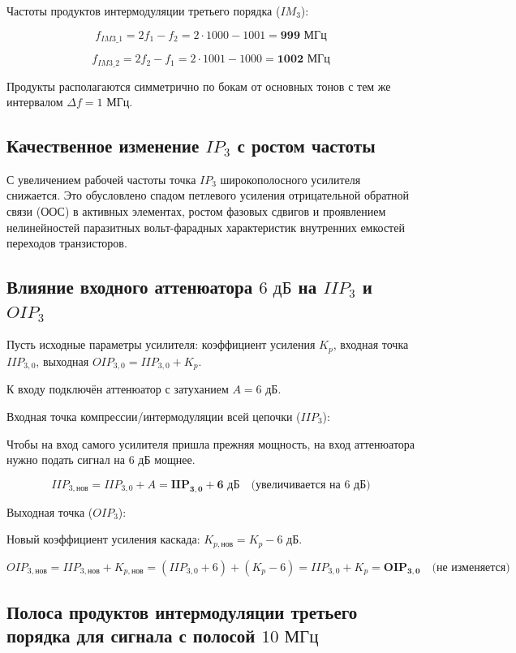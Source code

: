 Частоты продуктов интермодуляции третьего порядка ($IM_3$):

$$f_{IM3\_1} = 2f_1 - f_2 = 2 \cdot 1000 - 1001 = \mathbf{999\text{ МГц}}$$

$$f_{IM3\_2} = 2f_2 - f_1 = 2 \cdot 1001 - 1000 = \mathbf{1002\text{ МГц}}$$

Продукты располагаются симметрично по бокам от основных тонов с тем же интервалом $\Delta f = 1\text{ МГц}$.

\subsection* {Качественное изменение $IP_3$ с ростом частоты}

С увеличением рабочей частоты точка $IP_3$ широкополосного усилителя снижается. Это обусловлено спадом петлевого усиления отрицательной обратной связи (ООС) в активных элементах, ростом фазовых сдвигов и проявлением нелинейностей паразитных вольт-фарадных характеристик внутренних емкостей переходов транзисторов.

\subsection* {Влияние входного аттенюатора $6\text{ дБ}$ на $IIP_3$ и $OIP_3$}

Пусть исходные параметры усилителя: коэффициент усиления $K_p$, входная точка $IIP_{3,0}$, выходная $OIP_{3,0} = IIP_{3,0} + K_p$.

К входу подключён аттенюатор с затуханием $A = 6\text{ дБ}$.

Входная точка компрессии/интермодуляции всей цепочки ($IIP_3$):

Чтобы на вход самого усилителя пришла прежняя мощность, на вход аттенюатора нужно подать сигнал на $6\text{ дБ}$ мощнее.

$$IIP_{3,\text{нов}} = IIP_{3,0} + A = \mathbf{IIP_{3,0} + 6\text{ дБ}}\quad \text{(увеличивается на 6 дБ)}$$

Выходная точка ($OIP_3$):

Новый коэффициент усиления каскада: $K_{p,\text{нов}} = K_p - 6\text{ дБ}$.

$$OIP_{3,\text{нов}} = IIP_{3,\text{нов}} + K_{p,\text{нов}} = (IIP_{3,0} + 6) + (K_p - 6) = IIP_{3,0} + K_p = \mathbf{OIP_{3,0}}\quad \text{(не изменяется)}$$

\subsection* {Полоса продуктов интермодуляции третьего порядка для сигнала с полосой $10\text{ МГц}$}

